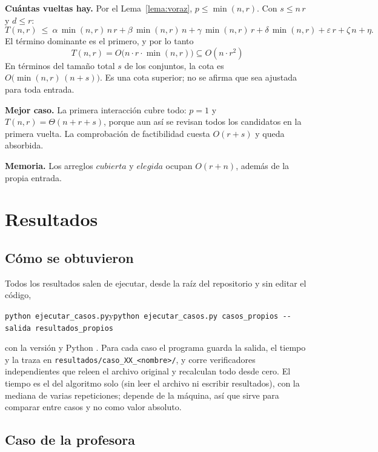 \documentclass[11pt,a4paper]{article}
\theoremstyle{definition}
\begin{document}
\textbf{Cuántas vueltas hay.} Por el Lema~\ref{lema:voraz}, $p\le\min(n,r)$. Con $s\le n\,r$ y $d\le r$:
\[
T(n,r)\ \le\ \alpha\,\min(n,r)\,n\,r+\beta\,\min(n,r)\,n+\gamma\,\min(n,r)\,r+\delta\,\min(n,r)+\varepsilon\,r+\zeta\,n+\eta .
\]
El término dominante es el primero, y por lo tanto
\[
\boxed{T(n,r)=O\bigl(n\cdot r\cdot\min(n,r)\bigr)\subseteq O(n\cdot r^{2})}
\]
En términos del tamaño total $s$ de los conjuntos, la cota es $O\bigl(\min(n,r)\,(n+s)\bigr)$. Es una cota superior; no se afirma que sea ajustada para toda entrada.

\textbf{Mejor caso.} La primera interacción cubre todo: $p=1$ y $T(n,r)=\Theta(n+r+s)$, porque aun así se revisan todos los candidatos en la primera vuelta. La comprobación de factibilidad cuesta $O(r+s)$ y queda absorbida.

\textbf{Memoria.} Los arreglos $cubierta$ y $elegida$ ocupan $O(r+n)$, además de la propia entrada.

\section{Resultados}\label{sec:resultados}

\subsection{Cómo se obtuvieron}

Todos los resultados salen de ejecutar, desde la raíz del repositorio y sin editar el código,
\begin{center}
\texttt{python ejecutar\_casos.py}\qquad y\qquad \texttt{python ejecutar\_casos.py casos\_propios -{}-salida resultados\_propios}
\end{center}
con la versión \texttt{\VersionEntrega} y Python \VersionPython. Para cada caso el programa guarda la salida, el tiempo y la traza en \texttt{resultados/caso\_XX\_<nombre>/}, y corre verificadores independientes que releen el archivo original y recalculan todo desde cero. El tiempo es el del algoritmo solo (sin leer el archivo ni escribir resultados), con la mediana de varias repeticiones; depende de la máquina, así que sirve para comparar entre casos y no como valor absoluto.

\subsection{Caso de la profesora}
\end{document}
